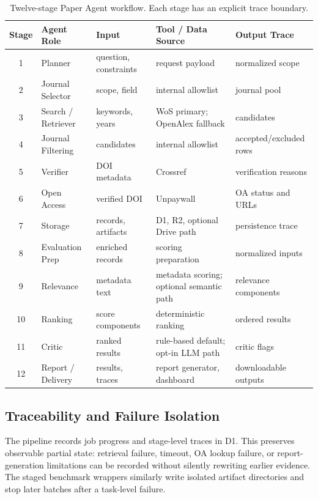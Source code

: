\documentclass[10pt,twocolumn]{article}
\begin{document}
\begin{table}[t]
\centering
\footnotesize
\begin{tabularx}{\textwidth}{c l X X X}
\toprule
Stage & Agent Role & Input & Tool / Data Source & Output Trace \\
\midrule
1 & Planner & question, constraints & request payload & normalized scope \\
2 & Journal Selector & scope, field & internal allowlist & journal pool \\
3 & Search / Retriever & keywords, years & WoS primary; OpenAlex fallback & candidates \\
4 & Journal Filtering & candidates & internal allowlist & accepted/excluded rows \\
5 & Verifier & DOI metadata & Crossref & verification reasons \\
6 & Open Access & verified DOI & Unpaywall & OA status and URLs \\
7 & Storage & records, artifacts & D1, R2, optional Drive path & persistence trace \\
8 & Evaluation Prep & enriched records & scoring preparation & normalized inputs \\
9 & Relevance & metadata text & metadata scoring; optional semantic path & relevance components \\
10 & Ranking & score components & deterministic ranking & ordered results \\
11 & Critic & ranked results & rule-based default; opt-in LLM path & critic flags \\
12 & Report / Delivery & results, traces & report generator, dashboard & downloadable outputs \\
\bottomrule
\end{tabularx}
\caption{Twelve-stage Paper Agent workflow. Each stage has an explicit trace boundary.}
\label{tab:pipeline}
\end{table}

\subsection{Traceability and Failure Isolation}
The pipeline records job progress and stage-level traces in D1. This preserves observable partial state: retrieval failure, timeout, OA lookup failure, or report-generation limitations can be recorded without silently rewriting earlier evidence. The staged benchmark wrappers similarly write isolated artifact directories and stop later batches after a task-level failure.
\end{document}
